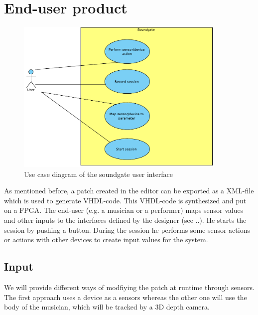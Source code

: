 \section{End-user product}

	\begin{figure}[!h]
		\centering
			\includegraphics[width=0.90\textwidth]{images/User_View.pdf}
		\caption{Use case diagram of the soundgate user interface}
		\label{fig:Soundgate_UserInterface}
	\end{figure}
	
	As mentioned before, a patch created in the editor can be exported as a XML-file which is used to generate VHDL-code. This VHDL-code is synthesized and put on a FPGA. The end-user (e.g. a musician or a performer) maps sensor values and other inputs to the interfaces defined by the designer (see ..). He starts the session by pushing a button. During the session he performs some sensor actions or actions with other devices to create input values for the system.
	
\subsection{Input}
We will provide different ways of modfiying the patch at runtime through sensors. The first approach uses a device as a sensors whereas the other one will use the body of the musician, which will be tracked by a 3D depth camera. 

